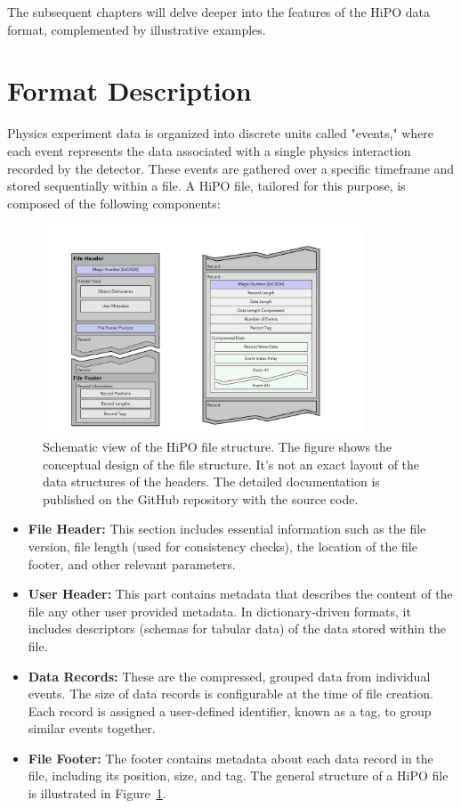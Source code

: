 \documentclass[preprint,12pt]{elsarticle}
\begin{document}
The subsequent chapters will delve deeper into the features of the HiPO data format, complemented by illustrative examples.

\section{Format Description}
\label{section-format-description}

Physics experiment data is organized into discrete units called "events," where each event represents the data associated with a single physics interaction recorded by the detector. These events are gathered over a specific timeframe and stored sequentially within a file. A HiPO file, tailored for this purpose, is composed of the following components:

\begin{figure}[h!]
  \begin{center}
    \includegraphics[width=0.85\textwidth]{images/file_structure.pdf}
 \end{center}
  \caption{Schematic view of the HiPO file structure. The figure shows the conceptual design of the file structure. It's not an exact layout of the data structures of the headers. The detailed documentation is published on the GitHub repository with the source code.}
 \label{schema:file}
\end{figure}


\begin{itemize}
\item {\bf File Header:} This section includes essential information such as the file version, file length (used for consistency checks), the location of the file footer, and other relevant parameters.
\item {\bf User Header:} This part contains metadata that describes the content of the file any other user provided metadata. In dictionary-driven formats, it includes descriptors (schemas for tabular data) of the data stored within the file.
\item {\bf Data Records:} These are the compressed, grouped data from individual events. The size of data records is configurable at the time of file creation. Each record is assigned a user-defined identifier, known as a tag, to group similar events together.
\item {\bf File Footer:} The footer contains metadata about each data record in the file, including its position, size, and tag.
The general structure of a HiPO file is illustrated in Figure~\ref{schema:file}.
\end{itemize}
\end{document}
